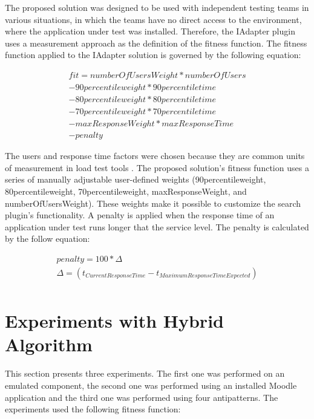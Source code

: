 \documentclass[espaco=umemeio,chapter=TITLE,twoside,openright]{abnt}
\begin{document}
The proposed solution was designed to be used with independent testing teams in various situations, in which the teams have no direct access to the environment, where the application under test was installed. Therefore, the IAdapter plugin uses a measurement approach as the definition of the fitness function. The fitness function applied to the IAdapter solution is governed by the following equation:

\begin{equation}
\begin{aligned}
fit=numberOfUsersWeight*numberOfUsers\\
-90percentileweight* 90percentiletime\\
-80percentileweight*80percentiletime\\
-70percentileweight*70percentiletime\\
-maxResponseWeight*maxResponseTime\\
-penalty
\end{aligned}
\end{equation}

The users and response time factors were chosen because they are common units of measurement in load test tools \cite{Sandler2004}. The proposed solution's fitness function uses a series of manually adjustable user-defined weights (90percentileweight, 80percentileweight,  70percentileweight, maxResponseWeight, and numberOfUsersWeight). These weights make it possible to customize the search plugin's functionality. A penalty is applied when the response time of an application under test runs longer that the service level. The penalty is calculated by the follow equation:

\begin{equation}
\begin{aligned}
penalty=100 * \Delta \\
\Delta=(t_{Current Response Time} - t_{Maximum Response Time Expected})\\
\end{aligned}
\end{equation}

\section{Experiments with Hybrid Algorithm}

This section presents three experiments. The first one was performed on an emulated component, the second one was performed using an installed Moodle application and the third one was performed using four antipatterns. The experiments used the following fitness function:
\end{document}
